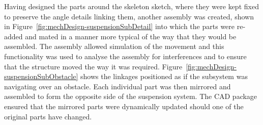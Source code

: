       Having designed the parts around the skeleton sketch, where they were kept fixed to preserve the angle details linking them, another assembly was created, shown in Figure~\ref{fig:mechDesign-suspensionSubDetail} into which the parts were re-added and mated in a manner more typical of the way that they would be assembled. The assembly allowed simulation of the movement and this functionality was used to analyse the assembly for interferences and to ensure that the structure moved the way it was required. Figure~\ref{fig:mechDesign-suspensionSubObstacle} shows the linkages positioned as if the subsystem was navigating over an obstacle. Each individual part was then mirrored and assembled to form the opposite side of the suspension system. The CAD package ensured that the mirrored parts were dynamically updated should one of the original parts have changed.
      
